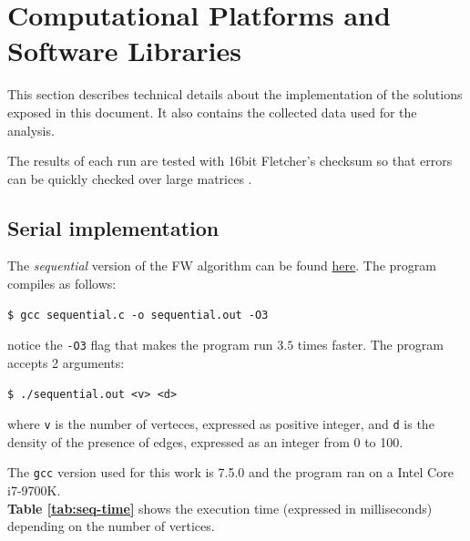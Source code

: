 \section{Computational Platforms and Software Libraries}
This section describes technical details about the implementation of the solutions exposed in this document. It also contains
the collected data used for the analysis.

The results of each run are tested with 16bit Fletcher's checksum so that errors can be quickly checked over large matrices \cite{fletcher}.
\subsection{Serial implementation}
The \emph{sequential} version of the FW algorithm can be found \href{https://github.com/firaja/Parallel-FloydWarshall/blob/master/sequential.c}{here}. 
The program compiles as follows:
\begin{lstlisting}[basicstyle=\footnotesize\ttfamily]
$ gcc sequential.c -o sequential.out -O3
\end{lstlisting}

notice the \texttt{-O3} flag that makes the program run $3.5$ times faster.
The program accepts 2 arguments:
\begin{lstlisting}[basicstyle=\footnotesize\ttfamily]
$ ./sequential.out <v> <d>
\end{lstlisting}
where \texttt{v} is the number of verteces, expressed as positive integer, and \texttt{d} is the density of the presence of edges, expressed as an integer from 0 to 100.
\par
The \texttt{gcc} version used for this work is 7.5.0 and the program ran on a Intel Core i7-9700K. \\
\textbf{Table \ref*{tab:seq-time}} shows the execution time (expressed in milliseconds) depending on the number of vertices.


